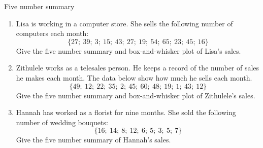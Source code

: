 \begin{exercises}{Five number summary}
\begin{enumerate} [noitemsep, label=\textbf{\arabic*}.]

\item Lisa is working in a computer store. She sells the following
  number of computers each month:
  \begin{equation}
    \{27;\ 39;\ 3;\ 15;\ 43;\ 27;\ 19;\ 54;\ 65;\ 23;\ 45;\ 16\}
  \end{equation}
  Give the five number summary and box-and-whisker plot of Lisa's
  sales.

\item Zithulele works as a telesales person. He keeps a record of the
  number of sales he makes each month. The data below show how much he
  sells each month.
  \begin{equation}
    \{49;\ 12;\ 22;\ 35;\ 2;\ 45;\ 60;\ 48;\ 19;\ 1;\ 43;\ 12\}
  \end{equation}
  Give the five number summary and box-and-whisker plot of Zithulele's
  sales.

\item Hannah has worked as a florist for nine months. She sold the
  following number of wedding bouquets:
  \begin{equation}
    \{16;\ 14;\ 8;\ 12;\ 6;\ 5;\ 3;\ 5;\ 7\}
  \end{equation}
  Give the five number summary of Hannah's sales.

\end{enumerate}
\end{exercises}

